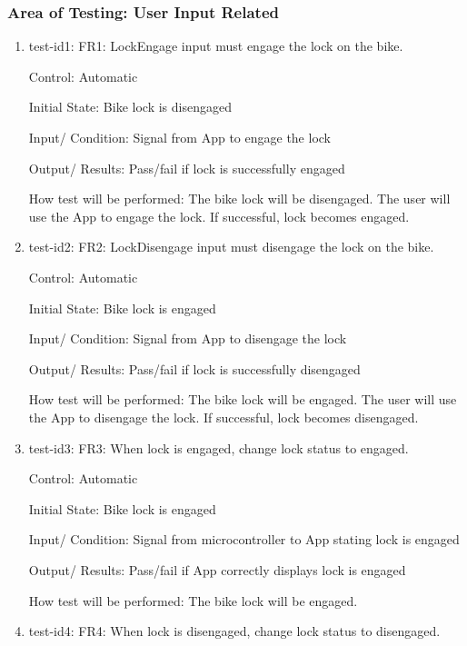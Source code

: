 \documentclass[12pt, titlepage]{article}
\begin{document}
\subsubsection{Area of Testing: User Input Related}

\begin{enumerate}

\item{test-id1: FR1: LockEngage input must engage the lock on the bike. \\} 

Control: Automatic 

Initial State: Bike lock is disengaged 

Input/ Condition: Signal from App to engage the lock 

Output/ Results: Pass/fail if lock is successfully engaged  

How test will be performed: The bike lock will be disengaged. The user will use the App to engage the lock. If successful, lock becomes engaged. 

\item{test-id2: FR2: LockDisengage input must disengage the lock on the bike. \\} 

Control: Automatic 

Initial State: Bike lock is engaged 

Input/ Condition: Signal from App to disengage the lock 

Output/ Results: Pass/fail if lock is successfully disengaged  

How test will be performed: The bike lock will be engaged. The user will use the App to disengage the lock. If successful, lock becomes disengaged. 

\item{test-id3: FR3: When lock is engaged, change lock status to engaged. \\} 

Control: Automatic 

Initial State: Bike lock is engaged 

Input/ Condition: Signal from microcontroller to App stating lock is engaged 

Output/ Results: Pass/fail if App correctly displays lock is engaged 

How test will be performed: The bike lock will be engaged.  

 \item{test-id4: FR4: When lock is disengaged, change lock status to disengaged. \\} 


\end{enumerate}
\end{document}
